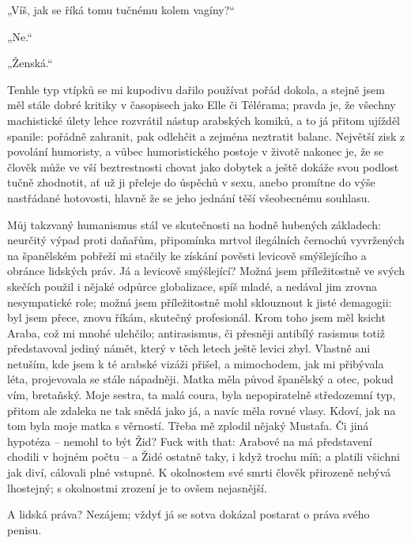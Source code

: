  „Víš, jak se říká tomu tučnému kolem vagíny?“

 „Ne.“

 „Ženská.“



 Tenhle typ vtípků se mi kupodivu dařilo používat pořád dokola, a stejně jsem měl stále dobré kritiky v časopisech jako  Elle či Télérama; pravda je, že všechny machistické úlety lehce rozvrátil nástup arabských komiků, a to já přitom ujížděl spanile: pořádně zahranit, pak odlehčit a zejména neztratit balanc. Největší zisk z povolání humoristy, a vůbec humoristického postoje v životě nakonec je, že se člověk může ve vší beztrestnosti chovat jako dobytek a ještě dokáže svou podlost tučně zhodnotit, ať už ji přeleje do úspěchů v sexu, anebo promítne do výše nastřádané hotovosti, hlavně že se jeho jednání těší všeobecnému souhlasu.

 Můj takzvaný humanismus stál ve skutečnosti na hodně hubených základech: neurčitý výpad proti daňařům, připomínka mrtvol ilegálních černochů vyvržených na španělském pobřeží mi stačily ke získání pověsti  levicově smýšlejícího a  obránce lidských práv. Já a levicově smýšlející? Možná jsem příležitostně ve svých skečích použil i nějaké odpůrce globalizace, spíš mladé, a nedával jim zrovna nesympatické role; možná jsem příležitostně mohl sklouznout k jisté demagogii: byl jsem přece, znovu říkám, skutečný profesionál. Krom toho jsem měl ksicht Araba, což mi mnohé ulehčilo; antirasismus, či přesněji antibílý rasismus totiž představoval jediný námět, který v těch letech ještě levici zbyl. Vlastně ani netuším, kde jsem k té arabské vizáži přišel, a mimochodem, jak mi přibývala léta, projevovala se stále nápadněji. Matka měla původ španělský a otec, pokud vím, bretaňský. Moje sestra, ta malá coura, byla nepopiratelně středozemní typ, přitom ale zdaleka ne tak snědá jako já, a navíc měla rovné vlasy. Kdoví, jak na tom byla moje matka s věrností. Třeba mě zplodil nějaký Mustafa. Či jiná hypotéza – nemohl to být Žid?  Fuck with that: Arabové na má představení chodili v hojném počtu – a Židé ostatně taky, i když trochu míň; a platili všichni jak diví, cálovali plné vstupné. K okolnostem své smrti člověk přirozeně nebývá lhostejný; s okolnostmi zrození je to ovšem nejasnější.

 A  lidská práva? Nezájem; vždyť já se sotva dokázal postarat o práva svého penisu.  




